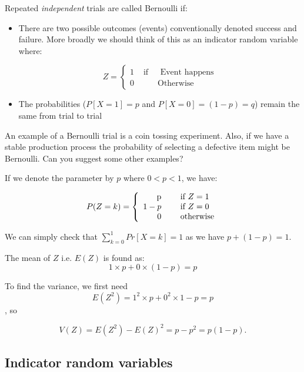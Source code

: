 \documentclass[12pt]{extbook}
\begin{document}
Repeated \emph{independent} trials are called Bernoulli if:
\begin{itemize}
\item There are two possible outcomes (events) conventionally denoted success
  and failure.   More broadly we should think of this as an indicator random variable where:

\begin{displaymath}
Z = \left\{ \begin{array}{rrr} 1 & \mbox{ if } & \mbox{ Event happens} \\ 
0 & & \mbox{Otherwise} \end{array} \right.
\end{displaymath}
\item The probabilities ($P[X=1]=p$ and $P[X=0]=(1-p)=q$) remain the same from trial
  to trial
\end{itemize}

An example of a Bernoulli trial is a coin tossing experiment.   Also,
if we have a stable production process the probability of selecting a
defective item might be Bernoulli.   Can you suggest some other examples?


If we denote the parameter by $p$ where $0 < p < 1$, we have:

\begin{displaymath}
P(Z=k) = \left\{ \begin{array}{rrl} $p$ & & \mbox{ if } Z = 1\\
1-p & & \mbox{ if } Z=0 \\
0 & & \mbox{ otherwise}
\end{array} \right.
\end{displaymath}

We can simply check that $\sum_{k=0}^1 Pr[X=k] = 1$ as we have $p + (1-p)=1$.

The mean of $Z$ i.e. $E(Z)$ is found as: 
\begin{displaymath}
1 \times p + 0 \times (1-p) = p
\end{displaymath}

To find the variance, we first need 
\begin{displaymath}
E(Z^2) = 1^2 \times p + 0^2 \times 1-p = p
\end{displaymath}, so 

\begin{displaymath}
V(Z) = E(Z^2)-E(Z)^2 = p - p^2 = p(1 - p).
\end{displaymath}


\subsection{Indicator random variables}
\end{document}

